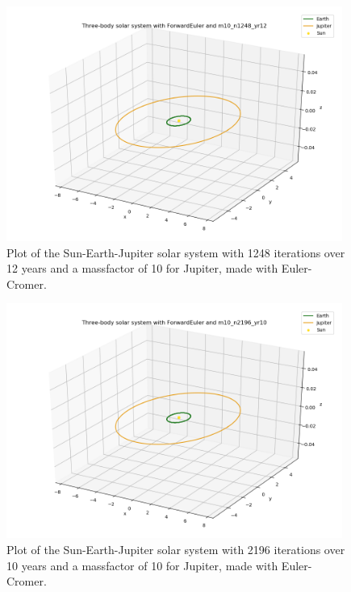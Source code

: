 \documentclass{article}
\begin{document}
    \begin{figure}[H]
        \centering
        \includegraphics[width = 11cm]{img/plot3D_S_E_J_F_m10_n1248_yr12.png}
        \caption{Plot of the Sun-Earth-Jupiter solar system with 1248 iterations over 12 years and a massfactor of 10 for Jupiter, made with Euler-Cromer.}
        \label{fig:plot3D_S_E_J_F_m10_n1248_yr12}
    \end{figure}

    \begin{figure}[H]
        \centering
        \includegraphics[width = 11cm]{img/plot3D_S_E_J_F_m10_n2196_yr10.png}
        \caption{Plot of the Sun-Earth-Jupiter solar system with 2196 iterations over 10 years and a massfactor of 10 for Jupiter, made with Euler-Cromer.}
        \label{fig:plot3D_S_E_J_F_m10_n2196_yr10}
    \end{figure}
\end{document}
